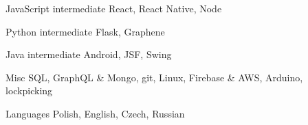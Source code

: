 
\begin{cvskills}

	\cvskill
		{JavaScript}
		{intermediate}
		{React, React Native, Node}

	\cvskill
		{Python}
		{intermediate}
		{Flask, Graphene}

	\cvskill
		{Java}
		{intermediate}
		{Android, JSF, Swing}

	\cvskill
		{Misc}
		{}
			{SQL, GraphQL \& Mongo, git, Linux, Firebase \& AWS, Arduino, lockpicking}

	\cvskill
		{Languages}
		{}
		{Polish, English, Czech, Russian}

\end{cvskills}
